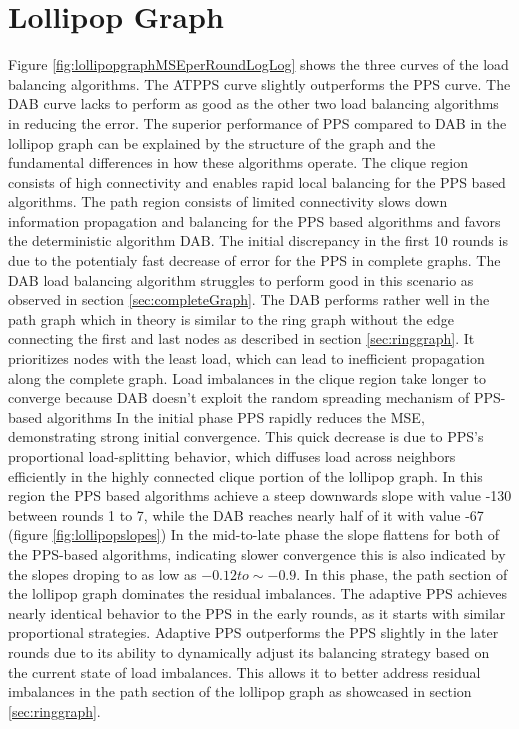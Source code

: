 \section{Lollipop Graph}\label{sec:lollipopgraph}
Figure \ref{fig:lollipopgraphMSEperRoundLogLog} shows the three curves of the load balancing algorithms. The ATPPS curve slightly outperforms the PPS curve. The DAB curve lacks to perform as good as the other two load balancing algorithms in reducing the error. The superior performance of PPS compared to DAB in the lollipop graph can be explained by the structure of the graph and the fundamental differences in how these algorithms operate. The clique region consists of high connectivity and enables rapid local balancing for the PPS based algorithms. The path region consists of limited connectivity slows down information propagation and balancing for the PPS based algorithms and favors the deterministic algorithm DAB. The initial discrepancy in the first 10 rounds is due to the potentialy fast decrease of error for the PPS in complete graphs. The DAB load balancing algorithm struggles to perform good in this scenario as observed in section \ref{sec:completeGraph}. The DAB performs rather well in the path graph which in theory is similar to the ring graph without the edge connecting the first and last nodes as described in section \ref{sec:ringgraph}. It prioritizes nodes with the least load, which can lead to inefficient propagation along the complete graph. Load imbalances in the clique region take longer to converge because DAB doesn't exploit the random spreading mechanism of PPS-based algorithms In the initial phase PPS rapidly reduces the MSE, demonstrating strong initial convergence. This quick decrease is due to PPS's proportional load-splitting behavior, which diffuses load across neighbors efficiently in the highly connected clique portion of the lollipop graph. In this region the PPS based algorithms achieve a steep downwards slope with value -130 between rounds 1 to 7, while the DAB reaches nearly half of it with value -67 (figure \ref{fig:lollipopslopes}) In the mid-to-late phase the slope flattens for both of the PPS-based algorithms, indicating slower convergence this is also indicated by the slopes droping to as low as $-0.12 to \sim-0.9$. In this phase, the path section of the lollipop graph dominates the residual imbalances. The adaptive PPS achieves nearly identical behavior to the PPS in the early rounds, as it starts with similar proportional strategies. Adaptive PPS outperforms the PPS slightly in the later rounds due to its ability to dynamically adjust its balancing strategy based on the current state of load imbalances. This allows it to better address residual imbalances in the path section of the lollipop graph as showcased in section \ref{sec:ringgraph}.

